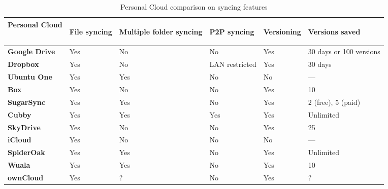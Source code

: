 {
\def\arraystretch{1.5}

\begin{table}
\begin{center}
    \begin{tabular}{ | p{3.3cm} | p{1.4cm} | p{1.4cm} | p{2.4cm} | p{1.4cm} | p{2.9cm} | }
    \hline
    \rowcolor[gray]{0.8}

	\textbf{Personal Cloud} &
	\begin{sideways}\textbf{File syncing}\end{sideways} &
	\begin{sideways}\textbf{Multiple folder syncing}\end{sideways} &
	\begin{sideways}\textbf{P2P syncing}\end{sideways} & 
	\begin{sideways}\textbf{Versioning}\end{sideways} & 
	\begin{sideways}\textbf{Versions saved}\end{sideways} \\ \hline

	\textbf{Google Drive} &
	Yes &
	No &
	No &
	Yes &
	30 days or 100 versions \\ \hline

	\textbf{Dropbox} &
	Yes &
	No &
	LAN restricted &
	Yes &
	30 days \\ \hline
	
	\textbf{Ubuntu One} &
	Yes &
	Yes &
	No &
	No &
	--- \\ \hline
	
	\textbf{Box} &
	Yes &
	No & 
	No &
	Yes &
	10 \\ \hline
	
	\textbf{SugarSync} & 
	Yes &
	Yes &
	No &
	Yes &
	2 (free), 5 (paid) \\ \hline
	
	\textbf{Cubby} &
	Yes &
	Yes &
	Yes &
	Yes &
	Unlimited \\ \hline
	
	\textbf{SkyDrive} & 
	Yes &
	No &
	No &
	Yes &
	25 \\ \hline

	\textbf{iCloud} &
	Yes &
	No &
	No &
	No &
	--- \\ \hline
	
	\textbf{SpiderOak} & 
	Yes &
	Yes &
	No &
	Yes &
	Unlimited \\ \hline

	\textbf{Wuala} &
	Yes &
	Yes &
	No &
	Yes &
	10 \\ \hline
	
	\textbf{ownCloud} &
	Yes &
	? &
	No &
	Yes &
	? \\ \hline

    \end{tabular}
    \caption{Personal Cloud comparison on syncing features}
    \label{tab:pc_syncing}
\end{center}
\end{table}
}

